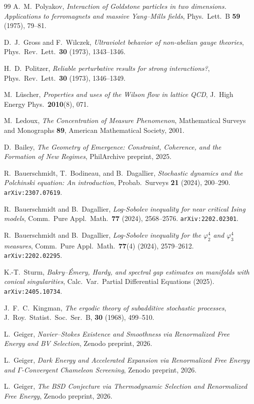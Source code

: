 \documentclass[12pt,a4paper]{article}
\theoremstyle{definition}
\theoremstyle{plain}
\theoremstyle{remark}
\begin{document}
\begin{thebibliography}{99}
A.~M.~Polyakov, \emph{Interaction of Goldstone particles in two dimensions.
Applications to ferromagnets and massive Yang--Mills fields},
Phys.\ Lett.\ B \textbf{59} (1975), 79--81.

D.~J.~Gross and F.~Wilczek, \emph{Ultraviolet behavior of non-abelian gauge theories},
Phys.\ Rev.\ Lett.\ \textbf{30} (1973), 1343--1346.

H.~D.~Politzer, \emph{Reliable perturbative results for strong interactions?},
Phys.\ Rev.\ Lett.\ \textbf{30} (1973), 1346--1349.

M.~L\"uscher, \emph{Properties and uses of the Wilson flow in lattice QCD},
J.\ High Energy Phys.\ \textbf{2010}(8), 071.

M.~Ledoux, \emph{The Concentration of Measure Phenomenon},
Mathematical Surveys and Monographs \textbf{89}, American Mathematical Society, 2001.

D.~Bailey, \emph{The Geometry of Emergence: Constraint, Coherence, and the Formation of New Regimes}, PhilArchive preprint, 2025.

R.~Bauerschmidt, T.~Bodineau, and B.~Dagallier, \emph{Stochastic dynamics and the Polchinski equation: An introduction}, Probab.\ Surveys \textbf{21} (2024), 200--290. \texttt{arXiv:2307.07619}.

R.~Bauerschmidt and B.~Dagallier, \emph{Log-Sobolev inequality for near critical Ising models}, Comm.\ Pure Appl.\ Math.\ \textbf{77} (2024), 2568--2576. \texttt{arXiv:2202.02301}.

R.~Bauerschmidt and B.~Dagallier, \emph{Log-Sobolev inequality for the $\varphi^4_2$ and $\varphi^4_3$ measures}, Comm.\ Pure Appl.\ Math.\ \textbf{77}(4) (2024), 2579--2612. \texttt{arXiv:2202.02295}.

K.-T.~Sturm, \emph{Bakry--\'Emery, Hardy, and spectral gap estimates on manifolds with conical singularities}, Calc.\ Var.\ Partial Differential Equations (2025). \texttt{arXiv:2405.10734}.

J.~F.~C.~Kingman, \textit{The ergodic theory of subadditive stochastic processes}, J.~Roy.\ Statist.\ Soc.\ Ser.~B, \textbf{30} (1968), 499--510.

L.~Geiger, \emph{Navier--Stokes Existence and Smoothness via Renormalized Free Energy and BV Selection}, Zenodo preprint, 2026.

L.~Geiger, \emph{Dark Energy and Accelerated Expansion via Renormalized Free Energy and $\Gamma$-Convergent Chameleon Screening}, Zenodo preprint, 2026.

L.~Geiger, \emph{The BSD Conjecture via Thermodynamic Selection and Renormalized Free Energy}, Zenodo preprint, 2026.

\end{thebibliography}
\end{document}
